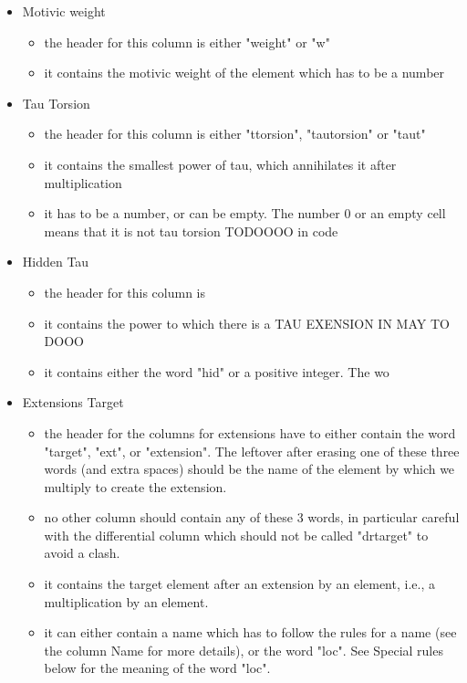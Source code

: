 \documentclass[a4paper,11pt]{article}
\begin{document}
\begin{itemize}
	\item{Motivic weight}
	\begin{itemize}
		\item the header for this column is either "weight" or "w"
		\item it contains the motivic weight of the element which has to be a number
	\end{itemize}
	
	\item{Tau Torsion}
	\begin{itemize}
		\item the header for this column is either "ttorsion", "tautorsion" or "taut"
		\item it contains the smallest power of tau, which annihilates it after multiplication
		\item it has to be a number, or can be empty. The number 0 or an empty cell means that it is not tau torsion TODOOOO in code
	\end{itemize}
	
	\item{Hidden Tau}
	\begin{itemize}
		\item the header for this column is 
		\item it contains the power to which there is a TAU EXENSION IN MAY TO DOOO
		\item it contains either the word "hid" or a positive integer. The wo
	\end{itemize}
	
	\item{Extensions Target}
	\begin{itemize}
		\item the header for the columns for extensions have to either contain the word "target", "ext", or "extension". The leftover after erasing one of these three words (and extra spaces) should be the name of the element by which we multiply to create the extension.
		\item no other column should contain any of these 3 words, in particular careful with the differential column which should not be called "drtarget" to avoid a clash.
		\item it contains the target element after an extension by an element, i.e., a multiplication by an element.
		\item it can either contain a name which has to follow the rules for a name (see the column Name for more details), or the word "loc". See Special rules below for the meaning of the word "loc".
	\end{itemize}
	

\end{itemize}
\end{document}
